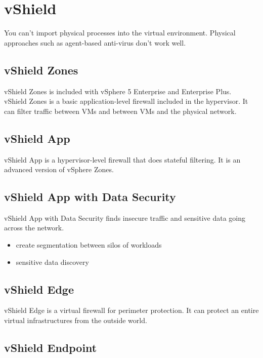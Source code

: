 \section{vShield}

You can't import physical processes into the virtual environment. Physical
approaches such as agent-based anti-virus don't work well.\\

\subsection{vShield Zones}

vShield Zones is included with vSphere 5 Enterprise and Enterprise Plus.\\

vShield Zones is a basic application-level firewall included in the 
hypervisor. It can filter traffic between VMs and between VMs and the physical
network.

\subsection{vShield App}

vShield App is a hypervisor-level firewall that does stateful filtering. It is
an advanced version of vSphere Zones.

\subsection{vShield App with Data Security}

vShield App with Data Security finds insecure traffic and sensitive data
going across the network.

\begin{itemize}

\item create segmentation between silos of workloads
\item sensitive data discovery

\end{itemize}

\subsection{vShield Edge}

vShield Edge is a virtual firewall for perimeter protection. It can protect
an entire virtual infrastructures from the outside world.

\subsection{vShield Endpoint}

